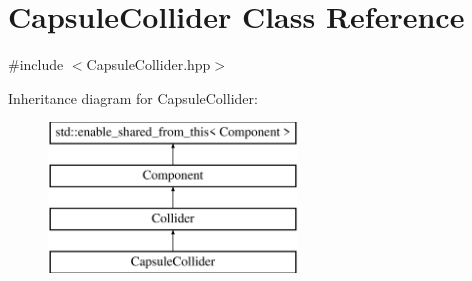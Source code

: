 \hypertarget{class_capsule_collider}{}\section{Capsule\+Collider Class Reference}
\label{class_capsule_collider}


{\ttfamily \#include $<$Capsule\+Collider.\+hpp$>$}

Inheritance diagram for Capsule\+Collider\+:\begin{figure}[H]
\begin{center}
\leavevmode
\includegraphics[height=4.000000cm]{class_capsule_collider}
\end{center}
\end{figure}

